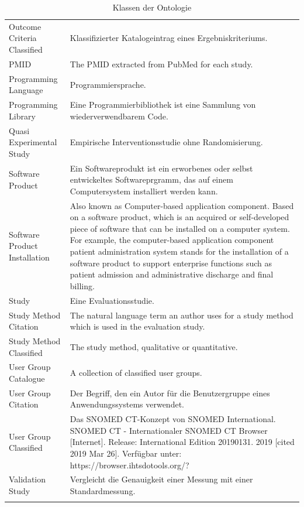 \begin{longtable}[ht]{p{} p{8cm}}
Outcome Criteria Classified & Klassifizierter Katalogeintrag eines Ergebniskriteriums. \\
PMID & The PMID extracted from PubMed for each study. \\
Programming Language & Programmiersprache. \\ 
Programming \newline Library & Eine Programmierbibliothek ist eine Sammlung von wiederverwendbarem Code. \\
Quasi Experimental Study & Empirische Interventionsstudie ohne Randomisierung. \\
Software Product & Ein Softwareprodukt ist ein erworbenes oder selbst entwickeltes Softwareprgramm, das auf einem Computersystem installiert werden kann. \\
Software Product \newline Installation & Also known as Computer-based application component. Based on a software product, which is an acquired or self-developed piece of software that can be installed on a computer system. For example, the computer-based application component patient administration system stands for the installation of a software product to support enterprise functions such as patient admission and administrative discharge and final billing. \\
Study & Eine Evaluationsstudie. \\
Study Method Citation & The natural language term an author uses for a study method which is used in the evaluation study. \\
Study Method \newline Classified & The study method, qualitative or quantitative. \\
User Group \newline Catalogue & A collection of classified user groups. \\
User Group Citation & Der Begriff, den ein Autor für die Benutzergruppe eines Anwendungssystems verwendet. \\
User Group \newline Classified & Das SNOMED CT-Konzept von SNOMED International. SNOMED CT - Internationaler SNOMED CT Browser [Internet]. Release: International Edition 20190131. 2019 [cited 2019 Mar 26]. Verfügbar unter: https://browser.ihtsdotools.org/? \\
Validation Study & Vergleicht die Genauigkeit einer Messung mit einer Standardmessung.\\
\bottomrule
\caption{Klassen der Ontologie}
\label{tab:hito_klassen}
\end{longtable}



